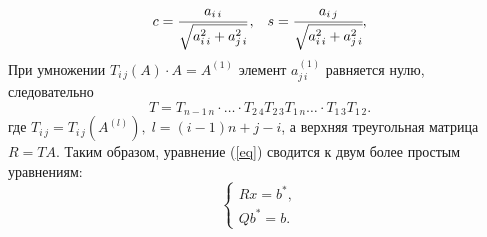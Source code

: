 \documentclass[12pt, a4paper]{article}
\begin{document}
		\[
		\begin{array}{cc}
			c = \cfrac{a_{i \, i}}{\sqrt{ a_{i \, i}^2 + a_{j \, i}^2}}\, , & s = \cfrac{a_{i \, j}}{\sqrt{ a_{i \, i}^2 + a_{j \, i}^2}},
		\end{array}
		\]
		При умножении $T_{i \, j}(A) \cdot  A = A^{(1)}$ элемент $a^{(1)}_{j \, i}$ равняется нулю, следовательно
		 \[
		 T = T_{n - 1 \, n} \cdot \ldots \cdot T_{2 \, 4} T_{2 \, 3} T_{1 \, n} \ldots \cdot T_{1 \, 3}T_{1 \, 2}.
		 \]
		 где $T_{i \, j} = T_{i \, j}(A^{(l)}), \; l = (i - 1) n + j - i$, а верхняя треугольная матрица $R = T A$. Таким образом, уравнение (\ref{eq}) сводится к двум более простым уравнениям:
		 \[
		 \begin{cases}
		 	R x = b^*, \\
		 	Q b^* = b.
		 \end{cases}
		 \]
		 
		 
		 
		
		
		
	
\end{document}
